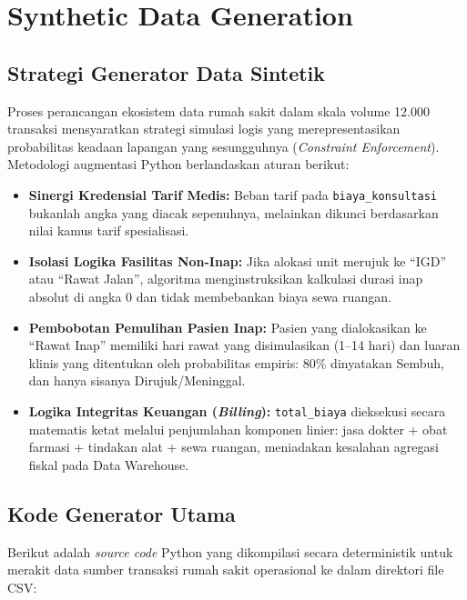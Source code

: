 
\chapter{Synthetic Data Generation}


 
\section{Strategi Generator Data Sintetik}
 
Proses perancangan ekosistem data rumah sakit dalam skala volume 12.000 transaksi mensyaratkan strategi simulasi logis yang merepresentasikan probabilitas keadaan lapangan yang sesungguhnya (\textit{Constraint Enforcement}). Metodologi augmentasi Python berlandaskan aturan berikut:
 
\begin{itemize}
    \item \textbf{Sinergi Kredensial Tarif Medis:} Beban tarif pada \texttt{biaya\_konsultasi} bukanlah angka yang diacak sepenuhnya, melainkan dikunci berdasarkan nilai kamus tarif spesialisasi.
    \item \textbf{Isolasi Logika Fasilitas Non-Inap:} Jika alokasi unit merujuk ke ``IGD'' atau ``Rawat Jalan'', algoritma menginstruksikan kalkulasi durasi inap absolut di angka 0 dan tidak membebankan biaya sewa ruangan.
    \item \textbf{Pembobotan Pemulihan Pasien Inap:} Pasien yang dialokasikan ke ``Rawat Inap'' memiliki hari rawat yang disimulasikan (1--14 hari) dan luaran klinis yang ditentukan oleh probabilitas empiris: 80\% dinyatakan Sembuh, dan hanya sisanya Dirujuk/Meninggal.
    \item \textbf{Logika Integritas Keuangan (\textit{Billing}):} \texttt{total\_biaya} dieksekusi secara matematis ketat melalui penjumlahan komponen linier: jasa dokter + obat farmasi + tindakan alat + sewa ruangan, meniadakan kesalahan agregasi fiskal pada Data Warehouse.
\end{itemize}
 
\section{Kode Generator Utama}
 
Berikut adalah \textit{source code} Python yang dikompilasi secara deterministik untuk merakit data sumber transaksi rumah sakit operasional ke dalam direktori file CSV:
 
